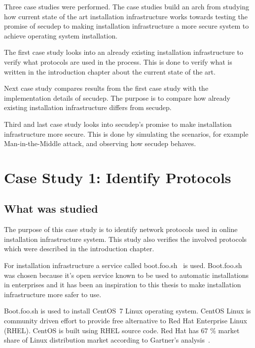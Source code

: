 
Three case studies were performed. The case studies build an arch from
studying how current state of the art installation infrastructure
works towards testing the promise of secudep to making installation
infrastructure a more secure system to achieve operating system
installation.

The first case study looks into an already existing installation
infrastructure to verify what protocols are used in the process. This
is done to verify what is written in the introduction chapter about
the current state of the art.

Next case study compares results from the first case study with the
implementation details of secudep. The purpose is to compare how
already existing installation infrastructure differs from secudep.

Third and last case study looks into secudep's promise to make
installation infrastructure more secure. This is done by simulating
the scenarios, for example Man-in-the-Middle attack, and observing how
secudep behaves.


\section{Case Study 1: Identify Protocols}
\label{sec:casestudy1}

\subsection{What was studied}

The purpose of this case study is to identify network protocols used
in online installation infrastructure system. This study also verifies
the involved protocols which were described in the introduction
chapter.

For installation infrastructure a service called
boot.foo.sh~\cite{boot-foo-sh} is used. Boot.foo.sh was chosen because
it's open service known to be used to automatic installations in
enterprises and it has been an inspiration to this thesis to make
installation infrastructure more safer to use.

Boot.foo.sh is used to install CentOS~7 Linux operating system. CentOS
Linux is community driven effort to provide free alternative to Red
Hat Enterprise Linux (RHEL). CentOS is built using RHEL source
code. Red Hat has 67 \% market share of Linux distribution market
according to Gartner's analysis~\cite{gartner-redhat}.

